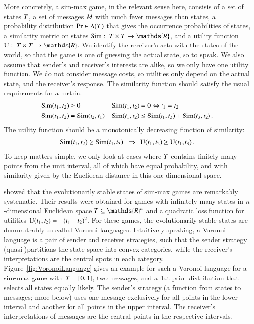More concretely, a sim-max game, in the relevant sense here, consists
of a set of states $T$, a set of messages $M$ with much
fever messages than states, a probability distribution $\Pr \in
\Delta(T)$ that gives the occurrence probabilities of states, a
similarity metric on states $\similarity \mycolon \States \times
\States \rightarrow \mathds{R}$, and a utility function $\Utils
\mycolon \States \times \States \rightarrow \mathds{R}$. We identify
the receiver's acts with the states of the world, so that the game is
one of guessing the actual state, so to speak. We also assume that
sender's and receiver's interests are alike, so we only have one
utility function. We do not consider message costs, so utilities only
depend on the actual state, and the receiver's response. The
similarity function should satisfy the usual requirements for a
metric:
\begin{align*}
  & \mathrm{Sim}(t_{\mathrm{1}}, t_{\mathrm{2}}) \ge 0 &&
  \mathrm{Sim}(t_{\mathrm{1}}, t_{\mathrm{2}}) = 0 \Leftrightarrow
  t_{\mathrm{1}} = t_{\mathrm{2}} \\
  & \mathrm{Sim}(t_{\mathrm{1}}, t_{\mathrm{2}}) = \mathrm{Sim}(t_{\mathrm{2}},
  t_{\mathrm{1}}) && \mathrm{Sim}(t_{\mathrm{1}}, t_{\mathrm{2}}) \le
  \mathrm{Sim}(t_{\mathrm{1}}, t_{\mathrm{3}}) + \mathrm{Sim}(t_{\mathrm{3}}, t_{\mathrm{2}})\,.
\end{align*}
The utility function should be a monotonically decreasing function of
similarity:
\begin{align*}
  \similarity(\mystate{1},\mystate{2}) \ge
  \similarity(\mystate{1},\mystate{3}) \ \ \Rightarrow \ \ 
  \Utils(\mystate{1},\mystate{2}) \ge
  \Utils(\mystate{1},\mystate{3})\,.
\end{align*}
To keep matters simple, we only look at cases where $T$ contains
finitely many points from the unit interval, all of which have equal
probability, and with similarity given by the Euclidean distance in
this one-dimensional space.\todo{introduce utilities here?}

\citet{JagerMetzger2011:Voronoi-Languag} showed that the
evolutionarily stable states of sim-max games are remarkably
systematic. Their results were obtained for games with infinitely many
states in $n$-dimensional Euclidean space $\States \subseteq
\mathds{R}^n$ and a quadratic loss function for utilities
$\mathrm{U}(t_{\mathrm{1}}, t_{\mathrm{2}}) = - (t_{\mathrm{1}} -
t_{\mathrm{2}})^2$. For these games, the evolutionarily stable states are
demonstrably so-called Voronoi-languages. Intuitively speaking, a
Voronoi language is a pair of sender and receiver strategies, such
that the sender strategy (quasi-)partitions the state space into
convex categories, while the receiver's interpretations are the
central spots in each category. Figure~\ref{fig:VoronoiLanguage} gives
an example for such a Voronoi-language for a sim-max game with
$T = [0,1]$, two messages, and a flat prior distribution that
selects all states equally likely. The sender's strategy (a function
from states to messages; more below) uses one message exclusively for
all points in the lower interval and another for all points in the
upper interval. The receiver's interpretations of messages are the
central points in the respective intervals. 

